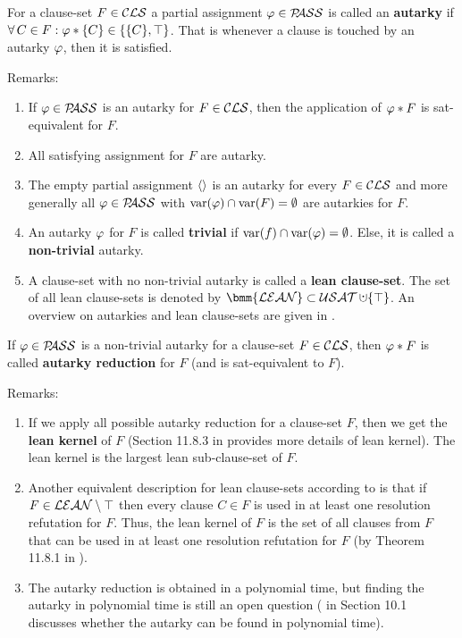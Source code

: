 \documentclass{report}
\begin{document}
\begin{defi}\label{def:autarky}
For a clause-set $F \in \mathcal{CLS}$ a partial assignment $\varphi \in \mathcal{P\hspace{-0.32em}ASS}$ is called an  \textbf{autarky} if $\forall\, C \in F : \varphi * \{ C \} \in \{ \{ C \}, \top \}$. That is whenever a clause is touched by an autarky $\varphi$, then it is satisfied.
\end{defi}
Remarks:
  \begin{enumerate}
  \item If $\varphi \in \mathcal{P\hspace{-0.32em}ASS}$ is an autarky for $F \in \mathcal{CLS}$, then the application of $\varphi *F$ is sat-equivalent for $F$. 
  \item All satisfying assignment for $F$ are autarky.
  \item The empty partial assignment $\langle  \rangle$ is an autarky for every $F \in \mathcal{CLS}$ and more generally all $\varphi \in \mathcal{P\hspace{-0.32em}ASS}$ with $\operatorname{var}(\varphi) \cap \operatorname{var}(F) = \emptyset$ are autarkies for $F$. 
  \item An autarky $\varphi$ for $F$ is called \textbf{trivial} if $\operatorname{var}(f) \cap \operatorname{var}(\varphi) = \emptyset$. Else, it is called a \textbf{non-trivial} autarky.
  \item A clause-set with no non-trivial autarky is called a \textbf{lean clause-set}. The set of all lean clause-sets is denoted by $\bmm{\Lean} \subset \Usat \addcup \set{\top}$. An overview on autarkies and lean clause-sets are given in \cite{Ku00f, Kullmann2007HandbuchMU}. 
  \end{enumerate}
  
\begin{defi}\label{def:autarky-redc}
If $\varphi \in \mathcal{P\hspace{-0.32em}ASS}$ is a non-trivial autarky for a clause-set $F \in \mathcal{CLS}$, then $\varphi *F$ is called \textbf{autarky reduction} for $F$ (and is sat-equivalent to $F$).
\end{defi} 
Remarks:
  \begin{enumerate}
  \item If we apply all possible autarky reduction for a clause-set $F$, then we get the \textbf{lean kernel} of $F$ (Section 11.8.3 in \cite{Kullmann2007HandbuchMU} provides more details of lean kernel). The lean kernel is the largest lean sub-clause-set of $F$.
  \item Another equivalent description for lean clause-sets according to \cite{Ku00f} is that if $F \in \mathcal{LEAN} \setminus \top$ then every clause $C \in F$ is used in at least one resolution refutation for $F$. Thus, the lean kernel of $F$ is the set of all clauses from $F$ that can be used in at least one resolution refutation for $F$ (by Theorem 11.8.1 in \cite{Kullmann2007HandbuchMU}).
  \item The autarky reduction is obtained in a polynomial time, but finding the autarky in polynomial time is still an open question (\cite{KullmannZhao2010Extremal} in Section 10.1 discusses whether the autarky can be found in polynomial time).
  \end{enumerate}
\end{document}
